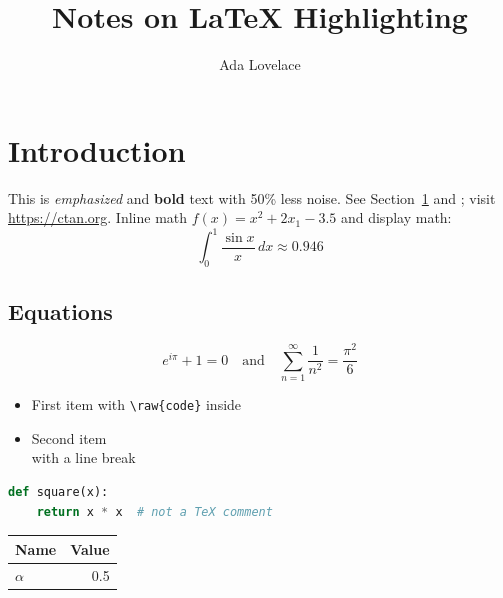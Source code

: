 \documentclass[11pt,a4paper]{article}
\title{Notes on \LaTeX{} Highlighting}
\author{Ada Lovelace}
\begin{document}
\maketitle

\section{Introduction}\label{sec:intro}
This is \emph{emphasized} and \textbf{bold} text with 50\% less noise.
See Section~\ref{sec:intro} and \cite[p.~4]{knuth1984}; visit \url{https://ctan.org}.
Inline math $f(x) = x^2 + 2x_1 - 3.5$ and display math:
$$\int_0^1 \frac{\sin x}{x}\,dx \approx 0.946$$

\subsection*{Equations}
\begin{equation}
  e^{i\pi} + 1 = 0 \quad \text{and} \quad \sum_{n=1}^{\infty} \frac{1}{n^2} = \frac{\pi^2}{6}
\end{equation}

\begin{itemize}
  \item First item with \verb|\raw{code}| inside
  \item Second item \\ with a line break
\end{itemize}

\begin{lstlisting}[language=Python]
def square(x):
    return x * x  # not a TeX comment
\end{lstlisting}

\begin{tabular}{|l|r|}
  Name & Value \\ \hline
  $\alpha$ & 0.5 \\
\end{tabular}
\end{document}
